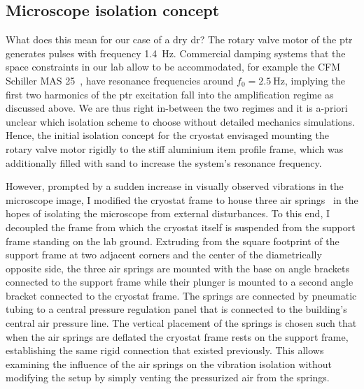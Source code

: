 \subsection{Microscope isolation concept}\label{subsec:setup:vibrations:isolation:concept}
What does this mean for our case of a dry \gls{dr}?
The rotary valve motor of the \gls{ptr} generates pulses with frequency \qty{1.4}{\hertz}.
Commercial damping systems that the space constraints in our lab allow to be accommodated, for example the CFM Schiller MAS 25~\cite{CFMSchiller}, have resonance frequencies around $f_0 = \qty{2.5}{\hertz}$, implying the first two harmonics of the \gls{ptr} excitation fall into the amplification regime as discussed above.
We are thus right in-between the two regimes and it is a-priori unclear which isolation scheme to choose without detailed mechanics simulations.
Hence, the initial isolation concept for the cryostat envisaged mounting the rotary valve motor rigidly to the stiff aluminium item profile frame, which was additionally filled with sand to increase the system's resonance frequency.

However, prompted by a sudden increase in visually observed vibrations in the microscope image, I modified the cryostat frame to house three air springs~ in the hopes of isolating the microscope from external disturbances.
To this end, I decoupled the frame from which the cryostat itself is suspended from the support frame standing on the lab ground.
Extruding from the square footprint of the support frame at two adjacent corners and the center of the diametrically opposite side, the three air springs are mounted with the base on angle brackets connected to the support frame while their plunger is mounted to a second angle bracket connected to the cryostat frame.
The springs are connected by pneumatic tubing to a central pressure regulation panel that is connected to the building's central air pressure line.
The vertical placement of the springs is chosen such that when the air springs are deflated the cryostat frame rests on the support frame, establishing the same rigid connection that existed previously.
This allows examining the influence of the air springs on the vibration isolation without modifying the setup by simply venting the pressurized air from the springs.


